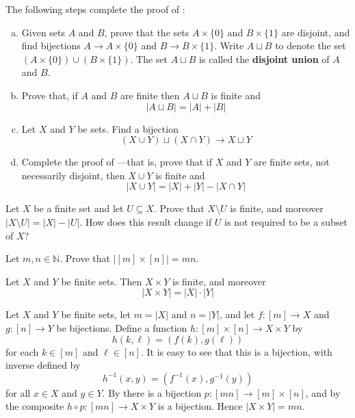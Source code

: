 \begin{exercise}
\label{exSizeOfUnion}
The following steps complete the proof of :
\begin{enumerate}[(a)]
\item Given sets $A$ and $B$, prove that the sets $A \times \{ 0 \}$ and $B \times \{ 1 \}$ are disjoint, and find bijections $A \to A \times \{ 0 \}$ and $B \to B \times \{ 1 \}$. Write $A \sqcup B$  to denote the set $(A \times \{ 0 \}) \cup (B \times \{ 1 \})$. The set $A \sqcup B$ is called the \textbf{disjoint union} of $A$ and $B$.
\item Prove that, if $A$ and $B$ are finite then $A \sqcup B$ is finite and
\[ |A \sqcup B| = |A| + |B| \]
\item Let $X$ and $Y$ be sets. Find a bijection
\[ (X \cup Y) \sqcup (X \cap Y) \to X \sqcup Y \]
\item Complete the proof of ---that is, prove that if $X$ and $Y$ are finite sets, not necessarily disjoint, then $X \cup Y$ is finite and
\[ |X \cup Y| = |X| + |Y| - |X \cap Y| \]
\end{enumerate}
\end{exercise}

\begin{exercise}
Let $X$ be a finite set and let $U \subseteq X$. Prove that $X \setminus U$ is finite, and moreover $|X \setminus U| = |X| - |U|$. How does this result change if $U$ is not required to be a subset of $X$?
\end{exercise}

\begin{exercise}
\label{exSizeOfCartesianProduct}
Let $m,n \in \mathbb{N}$. Prove that $|[m] \times [n]| = mn$.
\end{exercise}

\begin{proposition}
\label{propProductOfFiniteSetsIsFinite}
Let $X$ and $Y$ be finite sets. Then $X \times Y$ is finite, and moreover
\[ |X \times Y| = |X| \cdot |Y| \]
\end{proposition}
\begin{cproof}
Let $X$ and $Y$ be finite sets, let $m=|X|$ and $n=|Y|$, and let $f : [m] \to X$ and $g : [n] \to Y$ be bijections. Define a function $h : [m] \times [n] \to X \times Y$ by
\[ h(k,\ell) = (f(k),g(\ell)) \]
for each $k \in [m]$ and $\ell \in [n]$. It is easy to see that this is a bijection, with inverse defined by
\[ h^{-1}(x,y) = (f^{-1}(x), g^{-1}(y)) \]
for all $x \in X$ and $y \in Y$. By  there is a bijection $p : [mn] \to [m] \times [n]$, and by  the composite $h \circ p : [mn] \to X \times Y$ is a bijection. Hence $|X \times Y| = mn$.
\end{cproof}


